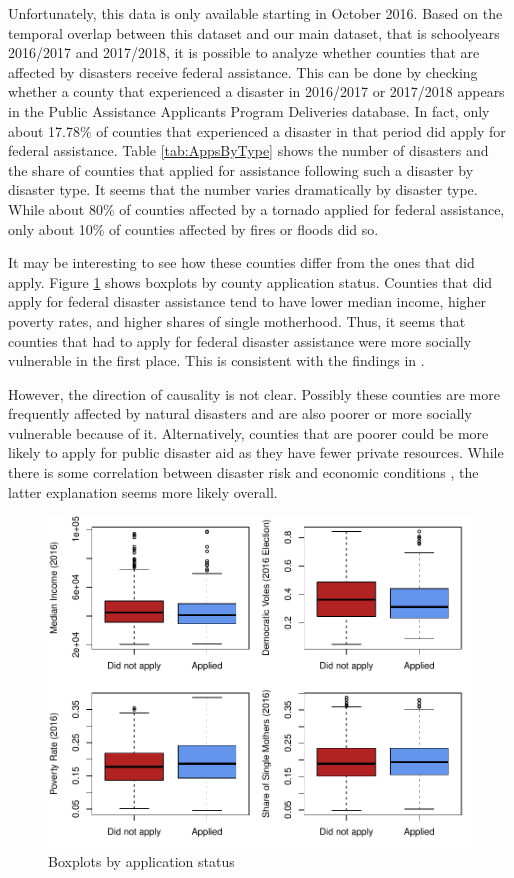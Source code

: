 Unfortunately, this data is only available starting in October 2016. Based on the temporal overlap between this dataset and our main dataset, that is schoolyears 2016/2017 and 2017/2018, it is possible to analyze whether counties that are affected by disasters receive federal assistance. This can be done by checking whether a county that experienced a disaster in 2016/2017 or 2017/2018 appears in the Public Assistance Applicants Program Deliveries database. In fact, only about 17.78\% of counties that experienced a disaster in that period did apply for federal assistance. Table \ref{tab:AppsByType} shows the number of disasters and the share of counties that applied for assistance following such a disaster by disaster type. It seems that the number varies dramatically by disaster type. While about 80\% of counties affected by a tornado applied for federal assistance, only about 10\% of counties affected by fires or floods did so.



It may be interesting to see how these counties differ from the ones that did apply. Figure \ref{AssistCovBoxplot} shows boxplots by county application status. Counties that did apply for federal disaster assistance tend to have lower median income, higher poverty rates, and higher shares of single motherhood. Thus, it seems that counties that had to apply for federal disaster assistance were more socially vulnerable in the first place. This is consistent with the findings in \cite{Gao_2022}.

However, the direction of causality is not clear. Possibly these counties are more frequently affected by natural disasters and are also poorer or more socially vulnerable because of it. Alternatively, counties that are poorer could be more likely to apply for public disaster aid as they have fewer private resources. While there is some correlation between disaster risk and economic conditions \citep[for example][]{Goodman_2020}, the latter explanation seems more likely overall.

\begin{figure}[!h]
	\centering
	\includegraphics[scale=1]{"../Code & Data/AssistanceCovBoxplot.pdf"}
	\caption{Boxplots by application status}
	\label{AssistCovBoxplot}
\end{figure}

